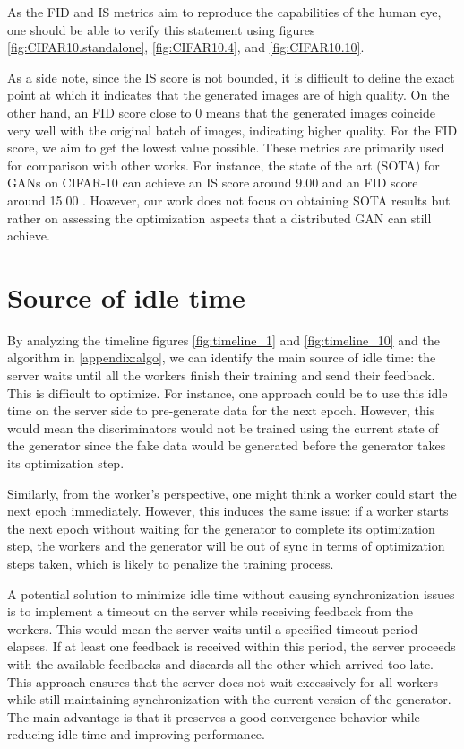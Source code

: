 As the FID and IS metrics aim to reproduce the capabilities of the human eye, one should be able to verify this statement using figures \ref{fig:CIFAR10.standalone}, \ref{fig:CIFAR10.4}, and \ref{fig:CIFAR10.10}.


As a side note, since the IS score is not bounded, it is difficult to define the exact point at which it indicates that the generated images are of high quality. On the other hand, an FID score close to 0 means that the generated images coincide very well with the original batch of images, indicating higher quality. For the FID score, we aim to get the lowest value possible. These metrics are primarily used for comparison with other works. For instance, the state of the art (SOTA) for GANs on CIFAR-10 can achieve an IS score around 9.00 and an FID score around 15.00 \cite{brock2019large}. However, our work does not focus on obtaining SOTA results but rather on assessing the optimization aspects that a distributed GAN can still achieve.

\section{Source of idle time} \label{sec:idle}
By analyzing the timeline figures \ref{fig:timeline_1} and \ref{fig:timeline_10} and the algorithm in \ref{appendix:algo}, we can identify the main source of idle time: the server waits until all the workers finish their training and send their feedback. This is difficult to optimize. For instance, one approach could be to use this idle time on the server side to pre-generate data for the next epoch. However, this would mean the discriminators would not be trained using the current state of the generator since the fake data would be generated before the generator takes its optimization step.

Similarly, from the worker's perspective, one might think a worker could start the next epoch immediately. However, this induces the same issue: if a worker starts the next epoch without waiting for the generator to complete its optimization step, the workers and the generator will be out of sync in terms of optimization steps taken, which is likely to penalize the training process.

A potential solution to minimize idle time without causing synchronization issues is to implement a timeout on the server while receiving feedback from the workers. This would mean the server waits until a specified timeout period elapses. If at least one feedback is received within this period, the server proceeds with the available feedbacks and discards all the other which arrived too late. This approach ensures that the server does not wait excessively for all workers while still maintaining synchronization with the current version of the generator. The main advantage is that it preserves a good convergence behavior while reducing idle time and improving performance.
